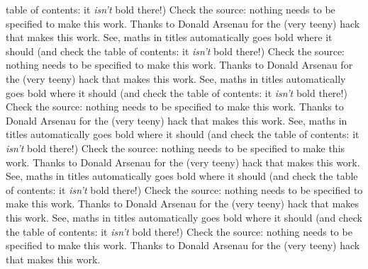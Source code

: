 table of contents: it \emph{isn't} bold there!) Check the source: nothing
needs to be specified to make this work. Thanks to Donald Arsenau for the
(very teeny) hack that makes this work.
See, maths in titles automatically goes bold where it should (and check the 
table of contents: it \emph{isn't} bold there!) Check the source: nothing
needs to be specified to make this work. Thanks to Donald Arsenau for the
(very teeny) hack that makes this work.
See, maths in titles automatically goes bold where it should (and check the 
table of contents: it \emph{isn't} bold there!) Check the source: nothing
needs to be specified to make this work. Thanks to Donald Arsenau for the
(very teeny) hack that makes this work.
See, maths in titles automatically goes bold where it should (and check the 
table of contents: it \emph{isn't} bold there!) Check the source: nothing
needs to be specified to make this work. Thanks to Donald Arsenau for the
(very teeny) hack that makes this work.
See, maths in titles automatically goes bold where it should (and check the 
table of contents: it \emph{isn't} bold there!) Check the source: nothing
needs to be specified to make this work. Thanks to Donald Arsenau for the
(very teeny) hack that makes this work.
See, maths in titles automatically goes bold where it should (and check the 
table of contents: it \emph{isn't} bold there!) Check the source: nothing
needs to be specified to make this work. Thanks to Donald Arsenau for the
(very teeny) hack that makes this work.

%
